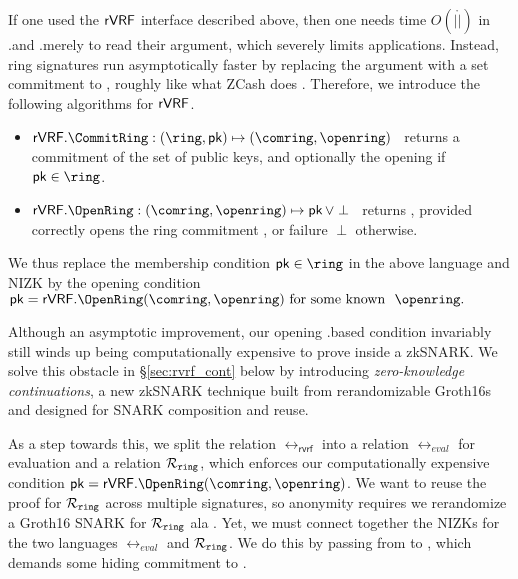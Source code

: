 
If one used the ${\mathsf{rVRF}}$ interface described above, then one needs time
$O(|\ring|)$ in \rVRF.\rSign and \rVRF.\rVerify merely to read their \ring
argument, which severely limits applications.
Instead, ring signatures run asymptotically faster by replacing the \ring
argument with a set commitment to \ring, roughly like what ZCash does \cite{zcash_protocol}. Therefore, we introduce the following algorithms for $ {\mathsf{rVRF}} $.
\begin{itemize} 
	\item $\rVRF.\CommitRing : (\ring,\pk) \mapsto (\comring,\openring)$ \,
	returns a commitment of the set \ring of public keys, and
	optionally the opening \openring if $\pk \in \ring$.
	\item $\rVRF.\OpenRing : (\comring,\openring) \mapsto \pk \, \lor \perp$ \,
	returns \pk, provided \openring correctly opens
	the ring commitment \comring, or failure $\perp$ otherwise.
\end{itemize}

We thus replace the membership condition $\pk \in \ring$ in the above
language and NIZK by the opening condition
$ \pk = \rVRF.\OpenRing(\comring,\openring) \textrm{\ for some known \ } \openring \mathperiod $
%


Although an asymptotic improvement, our opening \rVRF.\OpenRing based condition invariably
still winds up being computationally expensive to prove inside a zkSNARK.
We solve this obstacle in \S\ref{sec:rvrf_cont} below by introducing
{\em zero-knowledge continuations}, a new zkSNARK technique built from
rerandomizable Groth16s \cite{Groth16} and designed for SNARK composition and reuse.

As a step towards this, we split the relation $ \rel_{\mathsf{rvrf}} $ into a relation
$ \rel_{eval} $ for \rVRF evaluation and a relation $ \mathcal{R}_{\mathtt{ring}} $, which enforces our
computationally expensive condition $\pk = \rVRF.\OpenRing(\comring,\openring)$.
We want to reuse the proof for $ \mathcal{R}_{\mathtt{ring}} $ across multiple \rVRF signatures, so anonymity
requires we rerandomize a Groth16 SNARK for $ \mathcal{R}_{\mathtt{ring}} $
ala \cite[Theorem 3, Appendix C, pp. 31]{RandomizationGroth16}.
%
Yet, we must connect together the NIZKs for the two languages  $ \rel_{eval} $ and $ \mathcal{R}_{\mathtt{ring}}  $. We do this by passing \pk from \Lring to \Leval, which
demands some hiding commitment \compk to \pk.

